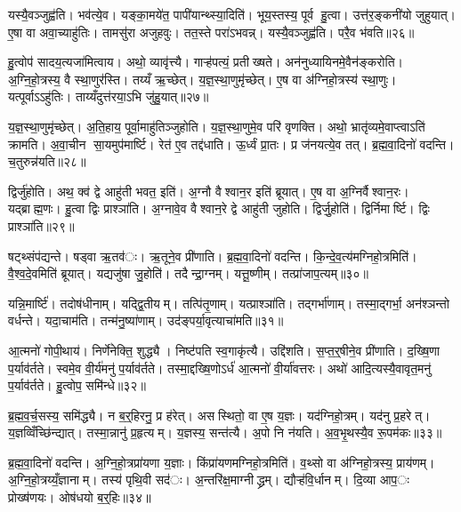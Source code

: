 यस्यै॒वञ्जुह्व॑ति। भव॑त्ये॒व। यङ्का॒मये॑त॒ पापी॑यान्थ्स्या॒दिति॑। भूय॒स्तस्य॒ पूर्व हु॒त्वा। उत्त॑र॒ङ्कनी॑यो जुहुयात्। ए॒षा वा अवा॒च्याहु॑तिः। तामसु॑रा अजुहवुः। तत॒स्ते परा॑ऽभवन्न्। यस्यै॒वञ्जुह्व॑ति। परै॒व भ॑वति॥२६॥

हु॒त्वोप॑ सादय॒त्यजा॑मित्वाय। अथो॒ व्यावृ॑त्त्यै। गाऱ्ह॑पत्यं॒ प्रतीख्षते। अन॑नुध्यायिनमे॒वैन॑ङ्करोति। अ॒ग्नि॒हो॒त्रस्य॒ वै स्था॒णुर॑स्ति। तय्यँ ऋ॒च्छेत्। य॒ज्ञ॒स्था॒णुमृ॑च्छेत्। ए॒ष वा अ॑ग्निहो॒त्रस्य॑ स्था॒णुः। यत्पूर्वाऽऽहु॑तिः। ताय्यँदुत्त॑रया॒ऽभि जु॑हु॒यात्॥२७॥

य॒ज्ञ॒स्था॒णुमृ॑च्छेत्। अ॒ति॒हाय॒ पूर्वा॒माहु॑तिञ्जुहोति। य॒ज्ञ॒स्था॒णुमे॒व परि॑ वृणक्ति। अथो॒ भ्रातृ॑व्यमे॒वाप्त्वाऽति॑ क्रामति। अ॒वा॒चीन सा॒यमुप॑मार्ष्टि। रेत॑ ए॒व तद्द॑धाति। ऊ॒र्ध्वं प्रा॒तः। प्र ज॑नयत्ये॒व तत्। ब्र॒ह्म॒वा॒दिनो॑ वदन्ति। च॒तुरुन्न॑यति॥२८॥

द्विर्जु॑होति। अथ॒ क्व॑ द्वे आहु॑ती भवत॒ इति॑। अ॒ग्नौ वैश्वान॒र इति॑ ब्रूयात्। ए॒ष वा अ॒ग्निर्वैश्वान॒रः। यद्ब्राह्म॒णः। हु॒त्वा द्विः प्राश्ञा॑ति। अ॒ग्नावे॒व वैश्वान॒रे द्वे आहु॑ती जुहोति। द्विर्जु॒होति॑। द्विर्निमार्ष्टि। द्विः प्राश्ञा॑ति॥२९॥

षट्थ्संप॑द्यन्ते। षड्वा ऋ॒तव॑ः। ऋ॒तूने॒व प्री॑णाति। ब्र॒ह्म॒वा॒दिनो॑ वदन्ति। कि॒न्दे॒व॒त्य॑मग्निहो॒त्रमिति॑। वै॒श्व॒दे॒वमिति॑ ब्रूयात्। यद्यजु॑षा जु॒होति॑। तदैन्द्रा॒ग्नम्। यत्तू॒ष्णीम्। तत्प्रा॑जाप॒त्यम्॥३०॥

यन्नि॒मार्ष्टि॑। तदोष॑धीनाम्। यद्द्वि॒तीयम्। तत्पि॑तृ॒णाम्। यत्प्राश्ञा॑ति। तद्गर्भा॑णाम्। तस्मा॒द्गर्भा॒ अन॑श्ञन्तो वर्धन्ते। यदा॒चाम॑ति। तन्म॑नु॒ष्या॑णाम्। उद॑ङ्पर्या॒वृत्याचा॑मति॥३१॥

आ॒त्मनो॑ गोपी॒थाय॑। निर्णे॑नेक्ति॒ शुद्ध्यै। निष्ट॑पति स्व॒गाकृ॑त्यै। उद्दि॑शति। स॒प्त॒र्॒षीने॒व प्री॑णाति। द॒ख्षि॒णा प॒र्याव॑र्तते। स्वमे॒व वी॒र्य॑मनु॑ प॒र्याव॑र्तते। तस्मा॒द्दख्षि॒णोऽर्ध॑ आ॒त्मनो॑ वी॒र्या॑वत्तरः। अथो॑ आदि॒त्यस्यै॒वावृत॒मनु॑ प॒र्याव॑र्तते। हु॒त्वोप॒ समि॑न्धे॥३२॥

ब्र॒ह्म॒व॒र्च॒सस्य॒ समि॑द्ध्यै। न ब॒र्॒हिरनु॒ प्र ह॑रेत्। असस्थितो॒ वा ए॒ष य॒ज्ञः। यद॑ग्निहो॒त्रम्। यद॑नु प्र॒हरेत्। य॒ज्ञव्विँच्छि॑न्द्यात्। तस्मा॒न्नानु॑ प्र॒हृत्यम्। य॒ज्ञस्य॒ सन्त॑त्यै। अ॒पो नि न॑यति। अ॒व॒भृ॒थस्यै॒व रू॒पम॑कः॥३३॥


ब्र॒ह्म॒वा॒दिनो॑ वदन्ति। अ॒ग्नि॒हो॒त्रप्रा॑यणा य॒ज्ञाः। किंप्रा॑यणमग्निहो॒त्रमिति॑। व॒थ्सो वा अ॑ग्निहो॒त्रस्य॒ प्राय॑णम्। अ॒ग्नि॒हो॒त्रय्यँ॒ज्ञानाम्। तस्य॑ पृथि॒वी सद॑ः। अ॒न्तरि॑क्ष॒माग्नीद्ध्रम्। द्यौऱ्ह॑वि॒र्धानम्। दि॒व्या आप॒ः प्रोख्ष॑णयः। ओष॑धयो ब॒र्॒हिः॥३४॥

